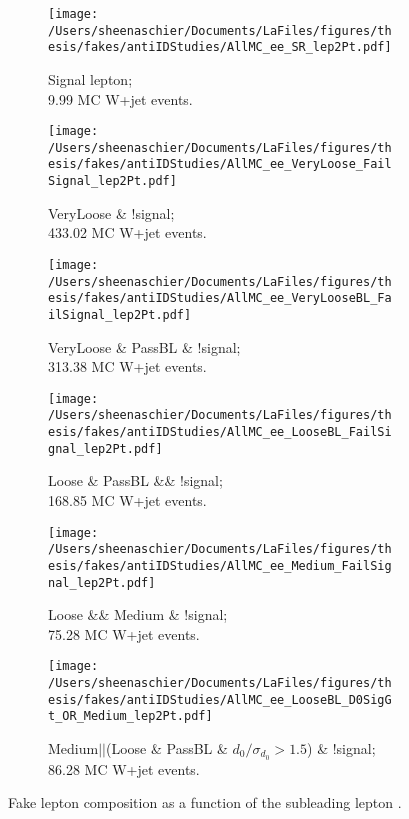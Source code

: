  \begin{figure}
 \centering
 \begin{subfigure}[b]{0.47\textwidth}
    \texttt{[image: /Users/sheenaschier/Documents/LaFiles/figures/thesis/fakes/antiIDStudies/AllMC\_ee\_SR\_lep2Pt.pdf]}
    \caption{Signal lepton;\\ 9.99 MC W+jet events.}
    \end{subfigure}
     \begin{subfigure}[b]{0.47\textwidth}
  \texttt{[image: /Users/sheenaschier/Documents/LaFiles/figures/thesis/fakes/antiIDStudies/AllMC\_ee\_VeryLoose\_FailSignal\_lep2Pt.pdf]}
 \caption{ VeryLoose \& !signal;\\ 433.02 MC W+jet events.}
 \end{subfigure}
  \begin{subfigure}[b]{0.47\textwidth}
     \texttt{[image: /Users/sheenaschier/Documents/LaFiles/figures/thesis/fakes/antiIDStudies/AllMC\_ee\_VeryLooseBL\_FailSignal\_lep2Pt.pdf]}
      \caption{VeryLoose \& PassBL \& !signal;\\ 313.38 MC W+jet events.}
 \end{subfigure}
   \begin{subfigure}[b]{0.47\textwidth}
     \texttt{[image: /Users/sheenaschier/Documents/LaFiles/figures/thesis/fakes/antiIDStudies/AllMC\_ee\_LooseBL\_FailSignal\_lep2Pt.pdf]}
      \caption{Loose \& PassBL \&\& !signal;\\ 168.85 MC W+jet events.}
 \end{subfigure}       
    \begin{subfigure}[b]{0.46\textwidth}
     \texttt{[image: /Users/sheenaschier/Documents/LaFiles/figures/thesis/fakes/antiIDStudies/AllMC\_ee\_Medium\_FailSignal\_lep2Pt.pdf]}
      \caption{Loose \&\& Medium \& !signal;\\ 75.28 MC W+jet events.}
 \end{subfigure}
    \begin{subfigure}[b]{0.46\textwidth}
     \texttt{[image: /Users/sheenaschier/Documents/LaFiles/figures/thesis/fakes/antiIDStudies/AllMC\_ee\_LooseBL\_D0SigGt\_OR\_Medium\_lep2Pt.pdf]}
      \caption{Medium$||$(Loose \& PassBL \& $d_0/\sigma_{d_0}> 1.5$) \& !signal; 86.28 MC W+jet events.}
 \end{subfigure} 
 
    \caption{Fake lepton composition as a function of the subleading lepton \pt. }
 \label{fig:LeptonIDComposition}
\end{figure}


